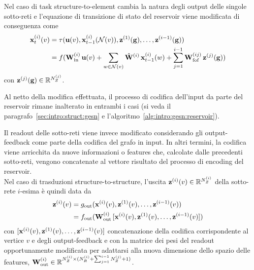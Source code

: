 Nel caso di task structure-to-element cambia la natura degli output delle singole sotto-reti e l'equazione di transizione di stato del reservoir viene modificata di conseguenza come
\begin{equation}\label{eq:constructiveGESN:str2el}
\begin{split}	
\vect{x}^{(i)}_t(v) 
	&= \tau( \vect{u}(v), \vect{x}^{(i)}_{t-1}(\mathcal{N}(v)), \vect{z}^{(1)}(\graph{g}), \dots, \vect{z}^{(i-1)}(\graph{g}) ) \\
	&= f( 
	\matr{W}^{(i)}_\textup{in} \, \vect{u}(v) + 
	\sum_{w \in \mathcal{N}(v)} \hat{\matr{W}}^{(i)} \, \vect{x}^{(i)}_{t-1}(w) +
	\sum_{j=1}^{i-1} \matr{W}^{(ij)}_\textup{fof} \, \vect{z}^{(j)}(\graph{g})	
	)
\end{split}
\end{equation}
con $\mathbf{z}^{(j)}(\mathbf{g}) \in \mathbb{R}^{N^{(j)}_Z}$. 

Al netto della modifica effettuata, il processo di codifica dell'input da parte del reservoir rimane inalterato in entrambi i casi (si veda il paragrafo~\ref{sec:intro:struct:gesn} e l'algoritmo~\vref{alg:intro:gesn:reservoir}).

Il readout delle sotto-reti viene invece modificato considerando gli output-feedback come parte della codifica del grafo in input. In altri termini, la codifica viene arricchita da nuove informazioni o features che, calcolate dalle precedenti sotto-reti, vengono concatenate al vettore risultato del processo di encoding del reservoir.\\
Nel caso di trasduzioni structure-to-structure, l'uscita $\mathbf{z}^{(i)}(v) \in \mathbb{R}^{N^{(i)}_Z}$ della sotto-rete $i$-esima è quindi data da
\begin{equation}
\begin{split}
\vect{z}^{(i)}(v) 
	&= g_\textup{out}( \vect{x}^{(i)}(v), \vect{z}^{(1)}(v), \dots, \vect{z}^{(i-1)}(v) ) \\
	&= f_\textup{out}( \matr{W}^{(i)}_\textup{out} \, 
		[\vect{x}^{(i)}(v), \vect{z}^{(1)}(v), \dots, \vect{z}^{(i-1)}(v)] )
\end{split}
\end{equation}
con $[\mathbf{x}^{(i)}(v), \mathbf{z}^{(1)}(v), \dots, \mathbf{z}^{(i-1)}(v)]$ concatenazione della codifica corrispondente al vertice $v$ e degli output-feedback e con la matrice dei pesi del readout opportunamente modificata per adattarsi alla nuova dimensione dello spazio delle features, $\matr{W}^{(i)}_\textup{out} \in \R^{N^{(i)}_Z \times (N^{(i)}_R + \sum_{j = 1}^{i-1} N^{(j)}_Z + 1)}$.

